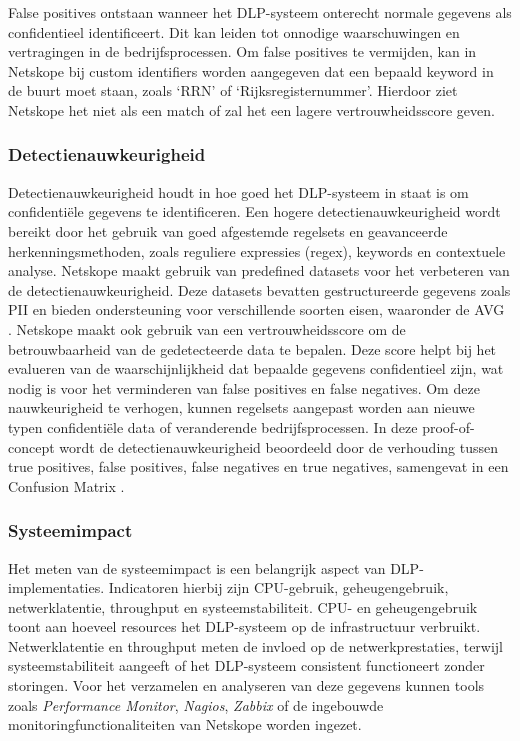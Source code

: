 False positives ontstaan wanneer het DLP-syst\-eem onterecht normale gegevens als confidentieel identificeert. 
Dit kan leiden tot onnodige waarschuwingen en vertragingen in de bedrijfsprocessen. 
Om false positives te vermijden, kan in Netskope bij custom identifiers worden aangegeven dat een bepaald keyword in de buurt moet staan, zoals `RRN' of `Rijksregisternummer'. 
Hierdoor ziet Netskope het niet als een match of zal het een lagere vertrouwheidsscore geven. 

\subsubsection{Detectienauwkeurigheid}

Detectienauwkeurigheid houdt in hoe goed het DLP-systeem in staat is om confidentiële gegevens te identificeren. 
Een hogere detectienauwkeurigheid wordt bereikt door het gebruik van goed afgestemde regelsets en geavanceerde herkenningsmethoden, zoals reguliere expressies (regex), keywords en contextuele analyse.
Netskope maakt gebruik van predefined datasets voor het verbeteren van de detectienauwkeurigheid. 
Deze datasets bevatten gestructureerde gegevens zoals PII en bieden ondersteuning voor verschillende soorten eisen, waaronder de AVG \autocite{Clementelli2023}. 
Netskope maakt ook gebruik van een vertrouwheidsscore om de betrouwbaarheid van de gedetecteerde data te bepalen. 
Deze score helpt bij het evalueren van de waarschijnlijkheid dat bepaalde gegevens confidentieel zijn, 
wat nodig is voor het verminderen van false positives en false negatives. 
Om deze nauwkeurigheid te verhogen, kunnen regelsets aangepast worden aan nieuwe typen confidentiële data of veranderende bedrijfsprocessen.
In deze proof-of-concept wordt de detectienauwkeurigheid beoordeeld door de verhouding tussen true positives, false positives, 
false negatives en true negatives, samengevat in een Confusion Matrix \autocite{Microsoftn.d.}.

\subsubsection{Systeemimpact}

Het meten van de systeemimpact is een belangrijk aspect van DLP-implementaties. 
Indicatoren hierbij zijn CPU-gebruik, geheugengebruik, netwerklatentie, throughput en systeemstabiliteit. 
CPU- en geheugengebruik toont aan hoeveel resources het DLP-systeem op de infrastructuur verbruikt. 
Netwerklatentie en throughput meten de invloed op de netwerkprestaties, 
terwijl systeemstabiliteit aangeeft of het DLP-systeem consistent functioneert zonder storingen. 
Voor het verzamelen en analyseren van deze gegevens kunnen tools zoals \textit{Performance Monitor}, 
\textit{Nagios}, \textit{Zabbix} of de ingebouwde monitoringfunctionaliteiten van Netskope worden ingezet. 

